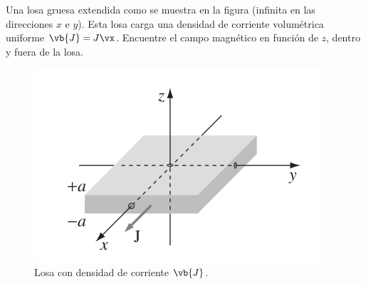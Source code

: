 \begin{mdframed}[style=warning]
	\begin{ejercicio}
		Una losa gruesa extendida como se muestra en la figura (infinita en las direcciones $x$ e $y$). Esta losa carga una densidad de corriente volumétrica uniforme $\vb{J} = J\vx$. Encuentre el campo magnético en función de $z$, dentro y fuera de la losa.
		\begin{figure}[H]
			\centering
			\includegraphics[scale=0.5]{./img/p3.png}
			\caption{Losa con densidad de corriente $\vb{J}$.}
			\label{DF}	
		\end{figure}
	\end{ejercicio}
\end{mdframed}






































































